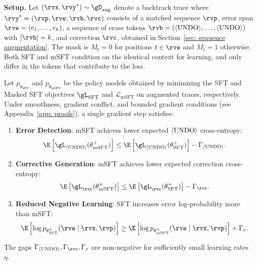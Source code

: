 \textbf{Setup.} Let $({\rvx}, \rvy^*) \sim \gD_\text{aug}$ denote a backtrack trace where $\rvy^* = (\rvp, \rve, \rvb, \rvc)$ consists of a matched sequence $\rvp$, error span $\rve = (e_1, \ldots, e_k)$, a sequence of erase tokens $\rvb = (\bk, \ldots, \bk)$ with $|\rvb| = k$, and correction $\rvc$, obtained in Section~\ref{sec: sequence augmentation}. The mask is $M_t = 0$ for positions $t \in \rve$ and $M_t = 1$ otherwise. 
Both SFT and mSFT condition on the identical context for learning, and only differ in the tokens that contribute to the loss.

\begin{proposition}\label{theorem: masked sft}
   Let $p_{\theta_\text{SFT}}$ and $p_{\theta_\text{mSFT}}$ be the policy models obtained by minimizing the SFT and Masked SFT objectives $\gL_\text{SFT}$ and $\mathcal{L}_{\text{mSFT}}$ on augmented traces, respectively. 
   Under smoothness, gradient conflict, and bounded gradient conditions (see Appendix~\ref{app: proofs}), a single gradient step satisfies:
   \begin{enumerate}[label=(\alph*), leftmargin=*, noitemsep, topsep=-1pt]
       \item \textbf{Error Detection}: mSFT achieves lower expected $\langle\textnormal{UNDO}\rangle$ cross-entropy:
       \begin{equation}
           \E\left[\gL_{\bk}(\theta_\text{mSFT}^+)\right] \leq \E\left[\gL_{\bk}(\theta_\text{SFT}^+)\right] - \Gamma_{\bk}.
       \end{equation}
       \item \textbf{Corrective Generation}: mSFT achieves lower expected correction cross-entropy:
       \begin{equation}
           \E\left[\gL_\rvc(\theta_\text{mSFT}^+)\right] \leq \E\left[\gL_\rvc(\theta_\text{SFT}^+)\right] - \Gamma_\rvc.
       \end{equation}
         \item \textbf{Reduced Negative Learning}: SFT increases error log-probability more than mSFT:
         \begin{equation}
             \E\left[\log p_{\theta_\text{SFT}^+}(\rve \mid \rvx, \rvp)\right] \geq \E\left[\log p_{\theta_\text{mSFT}^+}(\rve \mid \rvx, \rvp)\right] + \Gamma_e.
         \end{equation}
   \end{enumerate}
   The gaps $\Gamma_{\bk}, \Gamma_\rvc, \Gamma_e$ are non-negative for sufficiently small learning rates $\eta$.
\end{proposition}

